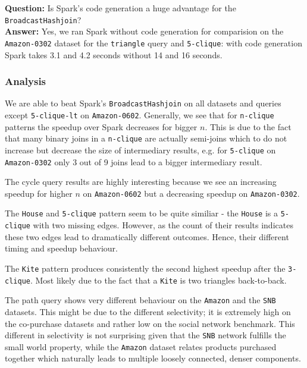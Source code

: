 \textbf{Question:} Is Spark's code generation a huge advantage for the \texttt{BroadcastHashjoin}?\\
\textbf{Answer:} Yes, we ran Spark without code generation for comparision on the \texttt{Amazon-0302} dataset for the \texttt{triangle}
query and \texttt{5-clique}: with code generation Spark takes 3.1 and 4.2 seconds without 14 and 16 seconds.

\subsubsection{Analysis}\label{sssec:seq-analysis}

We are able to beat Spark's \texttt{BroadcastHashjoin} on all datasets and queries except \texttt{5-clique-lt} on \texttt{Amazon-0602}.
Generally, we see that for \texttt{n-clique} patterns the speedup over Spark decreases for bigger $n$.
This is due to the fact that many binary joins in a \texttt{n-clique} are actually semi-joins which to do not increase but decrease the size of intermediary results,
e.g. for \texttt{5-clique} on \texttt{Amazon-0302} only 3 out of 9 joins lead to a bigger intermediary result.

The cycle query results are highly interesting because we see an increasing speedup for higher $n$ on \texttt{Amazon-0602} but a
decreasing speedup on \texttt{Amazon-0302}.

The \texttt{House} and \texttt{5-clique} pattern seem to be quite similiar - the \texttt{House} is a \texttt{5-clique} with two missing
edges.
However, as the count of their results indicates these two edges lead to dramatically different outcomes.
Hence, their different timing and speedup behaviour.

The \texttt{Kite} pattern produces consistently the second highest speedup after the \texttt{3-clique}.
Most likely due to the fact that a \texttt{Kite} is two triangles back-to-back.

The path query shows very different behaviour on the \texttt{Amazon} and the \texttt{SNB} datasets.
This might be due to the different selectivity; it is extremely high on the co-purchase datasets and rather low on the social network
benchmark.
This different in selectivity is not surprising given that the \texttt{SNB} network fulfills the small world property, while the
\texttt{Amazon} dataset relates products purchased together which naturally leads to multiple loosely connected, denser components.


